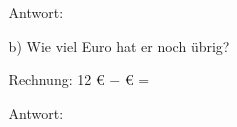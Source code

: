 \begin{enumerate}[resume, label=\arabic*.]
\begin{itemize}
        \vspace{0.3cm}
        Antwort: \underline{\hspace{10cm}}

        \vspace{0.5cm}
        \item[b)] Wie viel Euro hat er noch übrig?

        \vspace{0.3cm}
        Rechnung: 12 € $-$ \underline{\hspace{2cm}} € = \underline{\hspace{3cm}}

        \vspace{0.3cm}
        Antwort: \underline{\hspace{10cm}}
    \end{itemize}
\end{enumerate}
